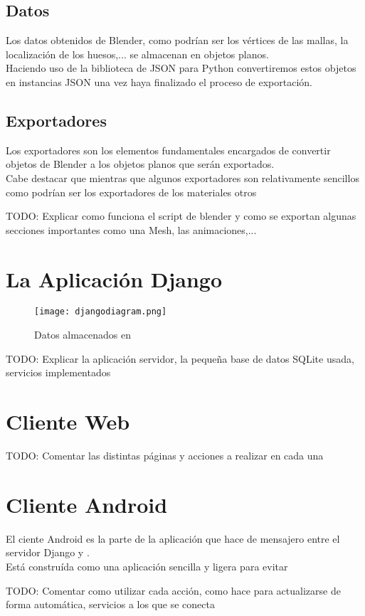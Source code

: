 \subsection{Datos}
Los datos obtenidos de Blender, como podrían ser los vértices de las mallas, la localización de los huesos,... se almacenan en objetos planos.\\
Haciendo uso de la biblioteca de JSON para Python convertiremos estos objetos en instancias JSON una vez haya finalizado el proceso de exportación.

\subsection{Exportadores}
Los exportadores son los elementos fundamentales encargados de convertir objetos de Blender a los objetos planos que serán exportados.\\
Cabe destacar que mientras que algunos exportadores son relativamente sencillos como podrían ser los exportadores de los materiales otros 

TODO: Explicar como funciona el script de blender y como se exportan algunas secciones importantes como una Mesh, las animaciones,...

\section{La Aplicación Django}

\begin{figure}[h!]
\begin{center}
\texttt{[image: djangodiagram.png]}
\end{center}
\caption[Datos almacenados en \studio]{Datos almacenados en \studio}
\end{figure}

TODO: Explicar la aplicación servidor, la pequeña base de datos SQLite usada, servicios implementados

\section{Cliente Web}
TODO: Comentar las distintas páginas y acciones a realizar en cada una

\section{Cliente Android}
El ciente Android es la parte de la aplicación que hace de mensajero entre el servidor Django y \robotto.\\
Está construída como una aplicación sencilla y ligera para evitar 

TODO: Comentar como utilizar cada acción, como hace para actualizarse de forma automática, servicios a los que se conecta